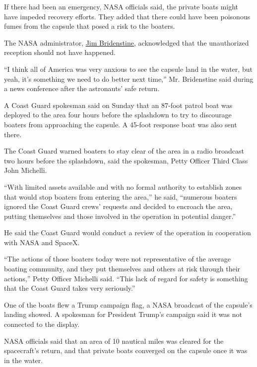 If there had been an emergency, NASA officials said, the private boats
might have impeded recovery efforts. They added that there could have
been poisonous fumes from the capsule that posed a risk to the boaters.

The NASA administrator,
\href{https://www.google.com/search?rlz=1C5GCEA_enUS904US905\&q=Jim+Bridenstine\&stick=H4sIAAAAAAAAAONgVuLSz9U3yCqvTDEresRoyi3w8sc9YSmdSWtOXmNU4-IKzsgvd80rySypFJLgYoOy-KR4uJC08Sxi5ffKzFVwKspMSc0rLsnMSwUAxtrzGlgAAAA}{Jim
Bridenstine}, acknowledged that the unauthorized reception should not
have happened.

``I think all of America was very anxious to see the capsule land in the
water, but yeah, it's something we need to do better next time,'' Mr.
Bridenstine said during a news conference after the astronauts' safe
return.

A Coast Guard spokesman said on Sunday that an 87-foot patrol boat was
deployed to the area four hours before the splashdown to try to
discourage boaters from approaching the capsule. A 45-foot response boat
was also sent there.

The Coast Guard warned boaters to stay clear of the area in a radio
broadcast two hours before the splashdown, said the spokesman, Petty
Officer Third Class John Michelli.

``With limited assets available and with no formal authority to
establish zones that would stop boaters from entering the area,'' he
said, ``numerous boaters ignored the Coast Guard crews' requests and
decided to encroach the area, putting themselves and those involved in
the operation in potential danger.''

He said the Coast Guard would conduct a review of the operation in
cooperation with NASA and SpaceX.

``The actions of those boaters today were not representative of the
average boating community, and they put themselves and others at risk
through their actions,'' Petty Officer Michelli said. ``This lack of
regard for safety is something that the Coast Guard takes very
seriously.''

One of the boats flew a Trump campaign flag, a NASA broadcast of the
capsule's landing showed. A spokesman for President Trump's campaign
said it was not connected to the display.

NASA officials said that an area of 10 nautical miles was cleared for
the spacecraft's return, and that private boats converged on the capsule
once it was in the water.

